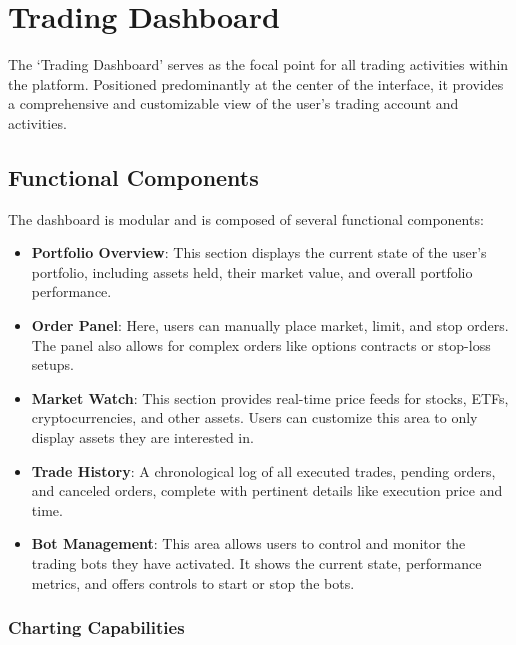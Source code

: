 \section{Trading Dashboard}

The `Trading Dashboard' serves as the focal point for all trading activities within the platform. Positioned predominantly at the center of the interface, it provides a comprehensive and customizable view of the user's trading account and activities.

\subsection{Functional Components}

The dashboard is modular and is composed of several functional components:

\begin{itemize}
  \item \textbf{Portfolio Overview}: This section displays the current state of the user's portfolio, including assets held, their market value, and overall portfolio performance.
  
  \item \textbf{Order Panel}: Here, users can manually place market, limit, and stop orders. The panel also allows for complex orders like options contracts or stop-loss setups.
  
  \item \textbf{Market Watch}: This section provides real-time price feeds for stocks, ETFs, cryptocurrencies, and other assets. Users can customize this area to only display assets they are interested in.
  
  \item \textbf{Trade History}: A chronological log of all executed trades, pending orders, and canceled orders, complete with pertinent details like execution price and time.
  
  \item \textbf{Bot Management}: This area allows users to control and monitor the trading bots they have activated. It shows the current state, performance metrics, and offers controls to start or stop the bots.
\end{itemize}

\subsubsection{Charting Capabilities}
\label{sec:charting}

